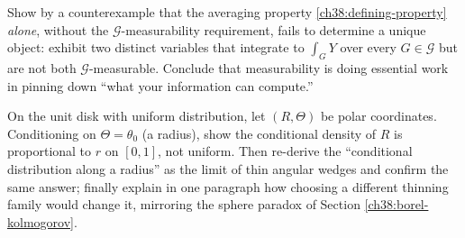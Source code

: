 \begin{exercise}
\label{ch38:ex-measurability}
Show by a counterexample that the averaging property \eqref{ch38:defining-property} \emph{alone},
without the $\mathcal{G}$-measurability requirement, fails to determine a unique object: exhibit two
distinct variables that integrate to $\int_G Y$ over every $G \in \mathcal{G}$ but are not both
$\mathcal{G}$-measurable. Conclude that measurability is doing essential work in pinning down ``what
your information can compute.''
\end{exercise}

\begin{exercise}
\label{ch38:ex-borel}
On the unit disk with uniform distribution, let $(R,\Theta)$ be polar coordinates. Conditioning on
$\Theta = \theta_0$ (a radius), show the conditional density of $R$ is proportional to $r$ on
$[0,1]$, not uniform. Then re-derive the ``conditional distribution along a radius'' as the limit of
thin angular wedges and confirm the same answer; finally explain in one paragraph how choosing a
different thinning family would change it, mirroring the sphere paradox of Section
\ref{ch38:borel-kolmogorov}.
\end{exercise}
